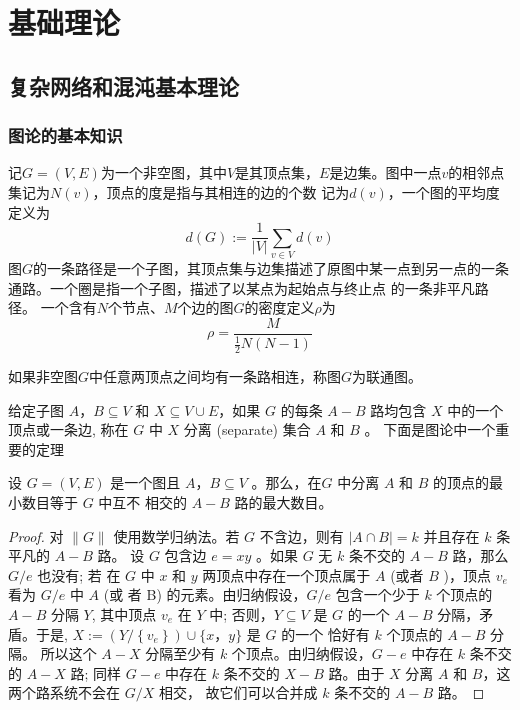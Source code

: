 \chapter{基础理论}
\section{复杂网络和混沌基本理论}
\subsection{图论的基本知识}
记$G=(V,E)$为一个非空图，其中$V$是其顶点集，$E$是边集。图中一点$v$的相邻点集记为$N(v)$，顶点的度是指与其相连的边的个数
记为$d(v)$，一个图的平均度定义为
\begin{equation}
    d(G):=\frac{1}{|V|} \sum_{v \in V} d(v)
\end{equation}
图$G$的一条路径是一个子图，其顶点集与边集描述了原图中某一点到另一点的一条通路。一个圈是指一个子图，描述了以某点为起始点与终止点
的一条非平凡路径。
一个含有$N$个节点、$M$个边的图$G$的密度定义$\rho$为
\begin{equation}
    \rho=\frac{M}{\frac{1}{2} N(N-1)}
\end{equation}
\begin{definition}
    如果非空图$G$中任意两顶点之间均有一条路相连，称图$G$为联通图。
\end{definition}
给定子图 $A，B \subseteq V$ 和 $X \subseteq V \cup E$，如果 $G$ 的每条 $A-B$ 路均包含 $X$ 中的一个顶点或一条边,
称在 $G$ 中 $X$ 分离 (separate) 集合 $A$ 和 $B$ 。
下面是图论中一个重要的定理
\begin{theorem}
    设 $G=(V,E)$ 是一个图且 $A，B \subseteq V$ 。那么，在$G$ 中分离 $A$ 和 $B$ 的顶点的最小数目等于 $G$ 中互不
    相交的 $A-B$ 路的最大数目。
\end{theorem}
\begin{proof}
    对 $\|G\|$ 使用数学归纳法。若 $G$ 不含边，则有 $|A \cap B|=k$ 并且存在 $k$ 条平凡的 $A-B$ 路。 
    设 $G$ 包含边 $e=x y$ 。如果 $G$ 无 $k$ 条不交的 $A-B$ 路，那么 $G / e$ 也没有; 
    若 在 $G$ 中 $x$ 和 $y$ 两顶点中存在一个顶点属于 $A$ (或者 $B$ )，顶点 $v_e$ 
    看为 $G / e$ 中 $A$ (或 者 B) 的元素。由归纳假设，$G / e$ 包含一个少于 $k$ 个顶点的 $A-B$ 分隔 $Y$,
     其中顶点 $v_e$ 在 $Y$ 中; 否则，$Y \subseteq V$ 是 $G$ 的一个 $A-B$ 分隔，矛盾。于是,
     $X:=\left(Y /\left\{v_e\right\}\right) \cup\{x，y\}$ 是 $G$ 的一个 恰好有 $k$ 个顶点的 $A-B$ 分隔。
      所以这个 $A-X$ 分隔至少有 $k$ 个顶点。由归纳假设，$G-e$ 中存在 $k$ 条不交的 $A-X$ 路; 
      同样 $G-e$ 中存在 $k$ 条不交的 $X-B$ 路。由于 $X$ 分离 $A$ 和 $B$，这两个路系统不会在 $G/ X$ 相交，
      故它们可以合并成 $k$ 条不交的 $A-B$ 路。
\end{proof}

